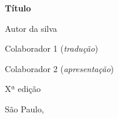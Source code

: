 




\begingroup\thispagestyle{empty}\vspace*{.05\textheight} 
\parindent0pt
              \formular
              \Huge
              \noindent
              \textbf{Título}

              {\brabo\LARGE
              \noindent Autor da silva}
              
              \vfill

  \newfontfamily{}
              \fontsize{30}{40}\selectfont \minion\small
              \noindent Colaborador 1 (\textit{tradução})
              \vspace{0.1cm}

              \noindent Colaborador 2 (\textit{apresentação})

              \vspace{0.5cm}
              
              {\noindent\fontsize{30}{40}\selectfont \minion\small\noindent Xª edição}

              \vfill

              \newfontfamily{}
              \normalsize
                           {\minion São Paulo, \the\year}

\endgroup
\pagebreak
